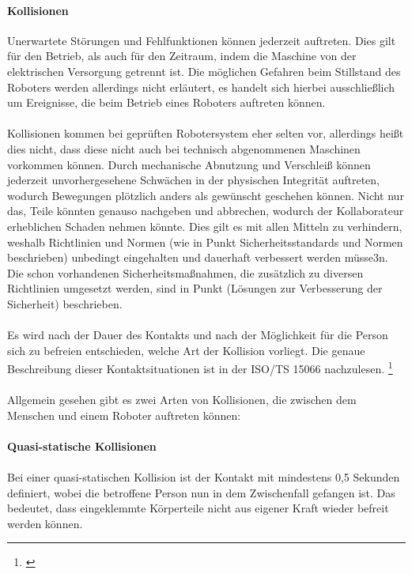 \documentclass[titlepage,12pt,twoside]{article}
\begin{document}
\paragraph{Kollisionen}
\hfill \break
\hfill \break
Unerwartete Störungen und Fehlfunktionen können jederzeit auftreten. Dies gilt für 
den Betrieb, als auch für den Zeitraum, indem die Maschine von der elektrischen 
Versorgung getrennt ist. Die möglichen Gefahren beim Stillstand des Roboters 
werden allerdings nicht erläutert, es handelt sich hierbei ausschließlich um 
Ereignisse, die beim Betrieb eines Roboters auftreten können. \\
\\
Kollisionen kommen bei geprüften Robotersystem eher selten vor, allerdings heißt 
dies nicht, dass diese nicht auch bei technisch abgenommenen Maschinen vorkommen 
können. Durch mechanische Abnutzung und Verschleiß können jederzeit 
unvorhergesehene Schwächen in der physischen Integrität auftreten, wodurch 
Bewegungen plötzlich anders als gewünscht geschehen können. Nicht nur das, Teile 
könnten genauso nachgeben und abbrechen, wodurch der Kollaborateur erheblichen 
Schaden nehmen könnte. Dies gilt es mit allen Mitteln zu verhindern, weshalb 
Richtlinien und Normen (wie in Punkt Sicherheitsstandards und Normen beschrieben) 
unbedingt eingehalten und dauerhaft verbessert werden müsse3n. Die schon vorhandenen 
Sicherheitsmaßnahmen, die zusätzlich zu diversen Richtlinien umgesetzt werden, 
sind in Punkt (Lösungen zur Verbesserung der Sicherheit) beschrieben. \\
\\
Es wird nach der Dauer des Kontakts und nach der Möglichkeit für die Person sich 
zu befreien entschieden, welche Art der Kollision vorliegt. Die genaue 
Beschreibung dieser Kontaktsituationen ist in der ISO/TS 15066 nachzulesen. \footnote{\cite{Frauenhofer17}} \\
\\
Allgemein gesehen gibt es zwei Arten von Kollisionen, die zwischen dem Menschen 
und einem Roboter auftreten können: \\
\\
\textbf{Quasi-statische Kollisionen} \\
\\
Bei einer quasi-statischen Kollision ist der Kontakt mit mindestens 0,5 Sekunden 
definiert, wobei die betroffene Person nun in dem Zwischenfall gefangen ist. Das 
bedeutet, dass eingeklemmte Körperteile nicht aus eigener Kraft wieder befreit 
werden können. \\
\end{document}
